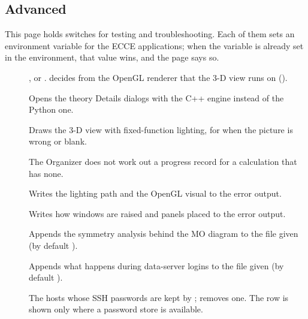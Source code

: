 \subsection*{Advanced}
This page holds switches for testing and troubleshooting. Each of them sets an environment variable for the ECCE applications; when the variable is already set in the environment, that value wins, and the page says so.
\begin{description}
	\item[] ,  or .  decides from the OpenGL renderer that the 3-D view runs on ().
	\item[] Opens the theory Details dialogs with the C++ engine instead of the Python one.
	\item[] Draws the 3-D view with fixed-function lighting, for when the picture is wrong or blank.
	\item[] The Organizer does not work out a progress record for a calculation that has none.
	\item[] Writes the lighting path and the OpenGL visual to the error output.
	\item[] Writes how windows are raised and panels placed to the error output.
	\item[] Appends the symmetry analysis behind the MO diagram to the file given (by default ).
	\item[] Appends what happens during data-server logins to the file given (by default ).
	\item[] The hosts whose SSH passwords are kept by ;  removes one. The row is shown only where a password store is available.
\end{description}

